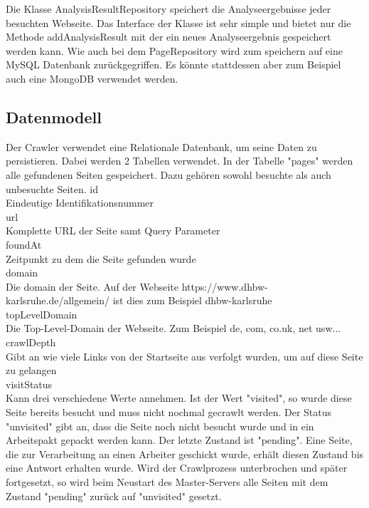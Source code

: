 Die Klasse AnalysisResultRepository speichert die Analyseergebnisse jeder besuchten Webseite. Das Interface der Klasse ist sehr simple und bietet nur die Methode addAnalysisResult mit der ein neues Analyseergebnis gespeichert werden kann. Wie auch bei dem PageRepository wird zum speichern auf eine MySQL Datenbank zurückgegriffen. Es könnte stattdessen aber zum Beispiel auch eine MongoDB verwendet werden.


\subsection{Datenmodell}
Der Crawler verwendet eine Relationale Datenbank, um seine Daten zu persistieren. Dabei werden 2 Tabellen verwendet. In der Tabelle "pages" werden alle gefundenen Seiten gespeichert. Dazu gehören sowohl besuchte als auch unbesuchte Seiten.
id \\
Eindeutige Identifikationsnummer \\
url \\
Komplette URL der Seite samt Query Parameter \\
foundAt \\
Zeitpunkt zu dem die Seite gefunden wurde \\
domain \\
Die domain der Seite. Auf der Webseite https://www.dhbw-karlsruhe.de/allgemein/ ist dies zum Beispiel dhbw-karlsruhe \\
topLevelDomain \\
Die Top-Level-Domain der Webseite. Zum Beispiel de, com, co.uk, net usw... \\
crawlDepth \\
Gibt an wie viele Links von der Startseite aus verfolgt wurden, um auf diese Seite zu gelangen \\
visitStatus \\
Kann drei verschiedene Werte annehmen. Ist der Wert "visited", so wurde diese Seite bereits besucht und muss nicht nochmal gecrawlt werden. Der Status "unvisited" gibt an, dass die Seite noch nicht besucht wurde und in ein Arbeitspakt gepackt werden kann. Der letzte Zustand ist "pending". Eine Seite, die zur Verarbeitung an einen Arbeiter geschickt wurde, erhält diesen Zustand bis eine Antwort erhalten wurde. Wird der Crawlprozess unterbrochen und später fortgesetzt, so wird beim Neustart des Master-Servers alle Seiten mit dem Zustand "pending" zurück auf "unvisited" gesetzt.\\

